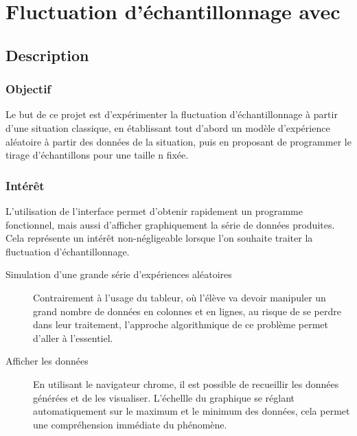 

\section{Fluctuation d'échantillonnage avec \mb}


\subsection{Description}

\subsubsection{Objectif}


\begin{formule}
Le but de ce projet est d'expérimenter la fluctuation d'échantillonnage à  partir d'une situation classique, en établissant tout d'abord un modèle d'expérience aléatoire à partir des données de la situation, puis en proposant de programmer le tirage d'échantillons pour une taille n fixée.
\end{formule}


\subsubsection{Intérêt}

 L'utilisation de l'interface \mb permet d'obtenir rapidement un programme fonctionnel, mais aussi d'afficher graphiquement la série de données produites. Cela représente un intérêt non-négligeable lorsque l'on souhaite traiter la fluctuation d'échantillonnage.

\begin{description}
    \item [Simulation d'une grande série d'expériences aléatoires] Contrairement à l'usage du tableur, où l'élève va devoir manipuler un grand nombre de données en colonnes et en lignes, au risque de se perdre dans leur traitement, l'approche algorithmique de  ce problème permet d'aller à l'essentiel.
    \item [Afficher les données]
    En utilisant le navigateur chrome, il est possible de recueillir les données générées et de les visualiser. L'échellle du graphique se réglant automatiquement sur le maximum et le minimum des données, cela permet une compréhension immédiate du phénomène.
\end{description}


